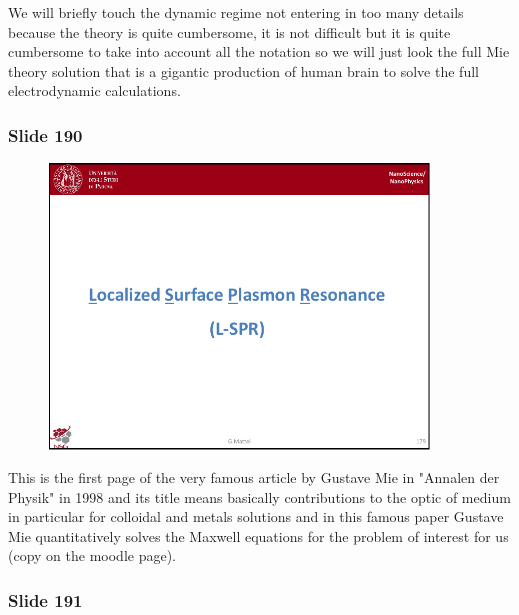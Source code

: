 \documentclass[../main/main.tex]{subfiles}
\begin{document}
We will briefly touch the dynamic regime not entering in too many details because the theory is quite cumbersome, it is not difficult but it is quite cumbersome to take into account all the notation so we will just look  the full Mie theory solution that is a gigantic production of human brain to solve the full electrodynamic calculations.

\newpage 
\subsubsection{Slide 190}

\begin{figure}[h!]
\centering
\includegraphics[page=12,width=0.9\textwidth]{../lessons/pdf_file/11_lesson.pdf}
\end{figure}

This is the first page of the very famous article by Gustave Mie in "Annalen der Physik" in 1998 and its title means basically contributions to the optic of medium in particular for colloidal and metals solutions and in this famous paper Gustave Mie quantitatively solves the Maxwell equations for the problem of interest for us (copy on the moodle page). 

\newpage

\subsubsection{Slide 191}
\end{document}
